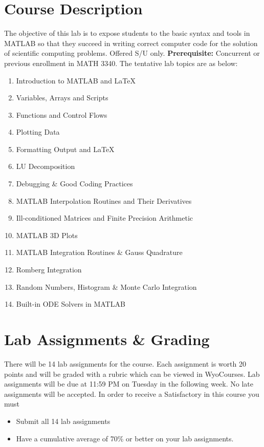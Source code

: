 \documentclass[11pt, letterpaper]{article}
\begin{document}
\section*{Course Description}
The objective of this lab is to expose students to the basic syntax and tools in MATLAB so that they succeed in writing correct computer code for the solution of scientific computing problems. Offered S/U only. \textbf{Prerequisite:} Concurrent or previous enrollment in MATH 3340. The tentative lab topics are as below:
\begin{enumerate}
  \setlength\itemsep{0em}
  \item Introduction to MATLAB and \LaTeX{}
  \item Variables, Arrays and Scripts
  \item Functions and Control Flows
  \item Plotting Data
  \item Formatting Output and \LaTeX{}
  \item LU Decomposition
  \item Debugging \& Good Coding Practices
  \item MATLAB Interpolation Routines and Their Derivatives
  \item Ill-conditioned Matrices and Finite Precision Arithmetic
  \item MATLAB 3D Plots
  \item MATLAB Integration Routines \& Gauss Quadrature
  \item Romberg Integration
  \item Random Numbers, Histogram \& Monte Carlo Integration
  \item Built-in ODE Solvers in MATLAB
\end{enumerate}


\section*{Lab Assignments \& Grading}
There will be 14 lab assignments for the course. Each assignment is worth 20 points and will be graded with a rubric which can be viewed in WyoCourses. Lab assignments will be due at 11:59 PM on Tuesday in the following week. No late assignments will be accepted. In order to receive a Satisfactory in this course you must
\begin{itemize}[itemsep=0pt, topsep=0pt]
  \item Submit all 14 lab assignments
  \item Have a cumulative average of 70\% or better on your lab assignments.
\end{itemize}
\end{document}
